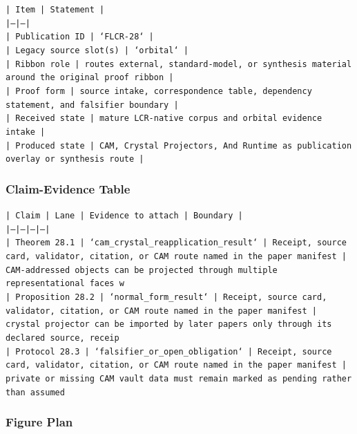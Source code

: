 \documentclass[11pt]{article}
\begin{document}
\noindent\texttt{| Item | Statement |}\\
\noindent\texttt{|---|---|}\\
\noindent\texttt{| Publication ID | `FLCR-28` |}\\
\noindent\texttt{| Legacy source slot(s) | `orbital` |}\\
\noindent\texttt{| Ribbon role | routes external, standard-model, or synthesis material around the original proof ribbon |}\\
\noindent\texttt{| Proof form | source intake, correspondence table, dependency statement, and falsifier boundary |}\\
\noindent\texttt{| Received state | mature LCR-native corpus and orbital evidence intake |}\\
\noindent\texttt{| Produced state | CAM, Crystal Projectors, And Runtime as publication overlay or synthesis route |}\\

\subsubsection*{Claim-Evidence Table}

\noindent\texttt{| Claim | Lane | Evidence to attach | Boundary |}\\
\noindent\texttt{|---|---|---|---|}\\
\noindent\texttt{| Theorem 28.1 | `cam\_crystal\_reapplication\_result` | Receipt, source card, validator, citation, or CAM route named in the paper manifest | CAM-addressed objects can be projected through multiple representational faces w}\\
\noindent\texttt{| Proposition 28.2 | `normal\_form\_result` | Receipt, source card, validator, citation, or CAM route named in the paper manifest | crystal projector can be imported by later papers only through its declared source, receip}\\
\noindent\texttt{| Protocol 28.3 | `falsifier\_or\_open\_obligation` | Receipt, source card, validator, citation, or CAM route named in the paper manifest | private or missing CAM vault data must remain marked as pending rather than assumed}\\

\subsubsection*{Figure Plan}
\end{document}
